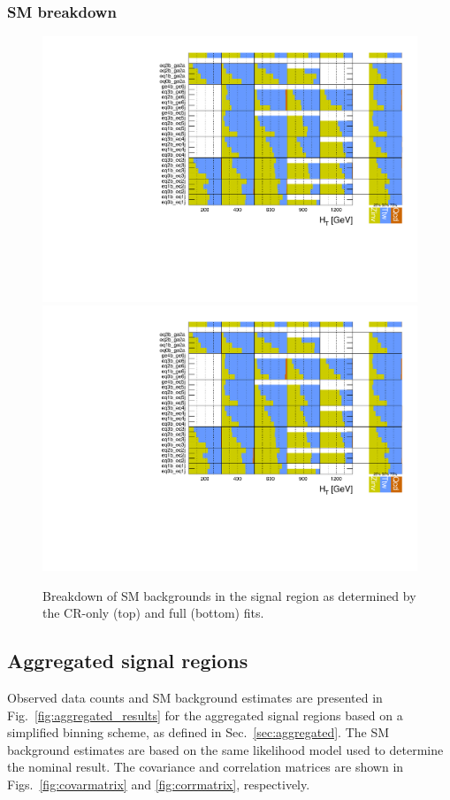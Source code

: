 \clearpage
\subsubsection{SM breakdown}

\begin{figure}[h!]
  \centering
  \caption{Breakdown of SM backgrounds in the signal region as
    determined by the CR-only (top) and full (bottom) fits.}
  \label{fig:breakdown}
  \includegraphics[width=0.8\linewidth]{figures/results/36invfb/breakdown/crfit/Signal_sample_composition.pdf}\\
  \includegraphics[width=0.8\linewidth]{figures/results/36invfb/breakdown/postfit/Signal_sample_composition.pdf}
\end{figure}

\clearpage
\subsection{Aggregated signal regions}
\label{sec:aggregated-results}

Observed data counts and SM background estimates are presented in 
Fig.~\ref{fig:aggregated_results} for 
the aggregated signal regions based on a simplified binning scheme, as
defined in Sec.~\ref{sec:aggregated}. The SM background estimates are
based on the same likelihood model used to determine the nominal
result. The covariance and correlation matrices are shown in
Figs.~\ref{fig:covarmatrix} and \ref{fig:corrmatrix}, respectively. 

